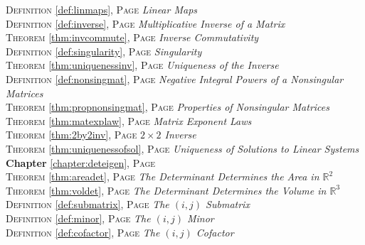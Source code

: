 \begin{multicols}{2}
{         \textsc{Definition} \ref{def:linmaps}, \textsc{Page} \pageref{def:linmaps} \textit{Linear Maps} \\
         \textsc{Definition} \ref{def:inverse}, \textsc{Page} \pageref{def:inverse} \textit{Multiplicative Inverse of a Matrix} \\
         \textsc{Theorem} \ref{thm:invcommute}, \textsc{Page} \pageref{thm:invcommute} \textit{Inverse Commutativity} \\
         \textsc{Definition} \ref{def:singularity}, \textsc{Page} \pageref{def:singularity} \textit{Singularity} \\
         \textsc{Theorem} \ref{thm:uniquenessinv}, \textsc{Page} \pageref{thm:uniquenessinv} \textit{Uniqueness of the Inverse} \\
         \textsc{Definition} \ref{def:nonsingmat}, \textsc{Page} \pageref{def:nonsingmat} \textit{Negative Integral Powers of a Nonsingular Matrices} \\
         \textsc{Theorem} \ref{thm:propnonsingmat}, \textsc{Page} \pageref{thm:propnonsingmat} \textit{Properties of Nonsingular Matrices} \\
         \textsc{Theorem} \ref{thm:matexplaw}, \textsc{Page} \pageref{thm:matexplaw} \textit{Matrix Exponent Laws} \\
         \textsc{Theorem} \ref{thm:2by2inv}, \textsc{Page} \pageref{thm:2by2inv} \textit{\(2\times 2\) Inverse} \\
         \textsc{Theorem} \ref{thm:uniquenessofsol}, \textsc{Page} \pageref{thm:uniquenessofsol} \textit{Uniqueness of Solutions to Linear Systems} \\
         \textbf{Chapter} \ref{chapter:deteigen}, \textsc{Page} \pageref{chapter:deteigen} \\
         \textsc{Theorem} \ref{thm:areadet}, \textsc{Page} \pageref{thm:areadet} \textit{The Determinant Determines the Area in \(\mathbb {R}^2\)} \\
         \textsc{Theorem} \ref{thm:voldet}, \textsc{Page} \pageref{thm:voldet} \textit{The Determinant Determines the Volume in \(\mathbb {R}^3\)} \\
         \textsc{Definition} \ref{def:submatrix}, \textsc{Page} \pageref{def:submatrix} \textit{The \((i,j)\) Submatrix} \\
         \textsc{Definition} \ref{def:minor}, \textsc{Page} \pageref{def:minor} \textit{The \((i,j)\) Minor} \\
         \textsc{Definition} \ref{def:cofactor}, \textsc{Page} \pageref{def:cofactor} \textit{The \((i,j)\) Cofactor} \\
}
\end{multicols}
